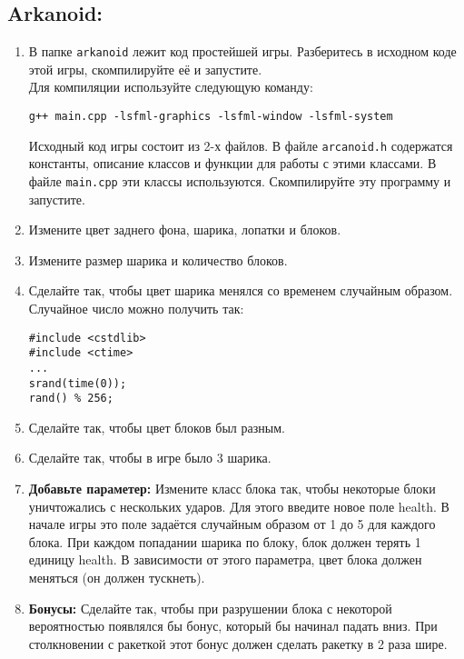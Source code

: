 \documentclass{article}
\begin{document}
\subsection*{Arkanoid:}
\begin{enumerate}
\item В папке \texttt{arkanoid} лежит код простейшей игры. Разберитесь в исходном коде этой игры, скомпилируйте её и запустите.\\
Для компиляции используйте следующую команду:
\begin{verbatim}
g++ main.cpp -lsfml-graphics -lsfml-window -lsfml-system
\end{verbatim}
Исходный код игры состоит из 2-х файлов. В файле \texttt{arcanoid.h} содержатся константы, описание классов и функции для работы с этими классами. В файле \texttt{main.cpp} эти классы используются. Скомпилируйте эту программу и запустите.
\item \textbf{} Измените цвет заднего фона, шарика, лопатки и блоков.\\
\item \textbf{} Измените размер шарика и количество блоков.\\
\item \textbf{} Сделайте так, чтобы цвет шарика менялся со временем случайным образом. Случайное число можно получить так:\\
\begin{lstlisting}
#include <cstdlib> 
#include <ctime> 
...
srand(time(0)); 
rand() % 256; 
\end{lstlisting}
\item \textbf{} Сделайте так, чтобы цвет блоков был разным.\\
\item \textbf{} Сделайте так, чтобы в игре было 3 шарика.\\
\item \textbf{Добавьте параметер:} Измените класс блока так, чтобы некоторые блоки уничтожались с нескольких ударов. Для этого введите новое поле health. В начале игры это поле задаётся случайным образом от 1 до 5 для каждого блока. При каждом попадании шарика по блоку, блок должен терять 1 единицу health. В зависимости от этого параметра, цвет блока должен меняться (он должен тускнеть).\\
\item \textbf{Бонусы:} Сделайте так, чтобы при разрушении блока с некоторой вероятностью появлялся бы бонус, который бы начинал падать вниз. При столкновении с ракеткой этот бонус должен сделать ракетку в 2 раза шире.

\end{enumerate}
\end{document}
